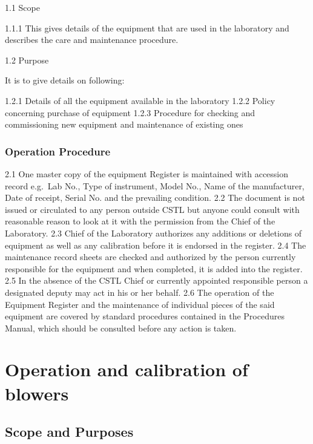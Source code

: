\documentclass[]{book}
\begin{document}
1.1 Scope

1.1.1 This gives details of the equipment that are used in the
laboratory and describes the care and maintenance procedure.

1.2 Purpose

It is to give details on following:

1.2.1 Details of all the equipment available in the laboratory 1.2.2
Policy concerning purchase of equipment 1.2.3 Procedure for checking and
commissioning new equipment and maintenance of existing ones

\subsection{Operation Procedure}\label{operation-procedure}

2.1 One master copy of the equipment Register is maintained with
accession record e.g.~Lab No., Type of instrument, Model No., Name of
the manufacturer, Date of receipt, Serial No. and the prevailing
condition. 2.2 The document is not issued or circulated to any person
outside CSTL but anyone could consult with reasonable reason to look at
it with the permission from the Chief of the Laboratory. 2.3 Chief of
the Laboratory authorizes any additions or deletions of equipment as
well as any calibration before it is endorsed in the register. 2.4 The
maintenance record sheets are checked and authorized by the person
currently responsible for the equipment and when completed, it is added
into the register. 2.5 In the absence of the CSTL Chief or currently
appointed responsible person a designated deputy may act in his or her
behalf. 2.6 The operation of the Equipment Register and the maintenance
of individual pieces of the said equipment are covered by standard
procedures contained in the Procedures Manual, which should be consulted
before any action is taken.



\chapter{Operation and calibration of
blowers}\label{operation-and-calibration-of-blowers}

\section{Scope and Purposes}\label{scope-and-purposes}
\end{document}
